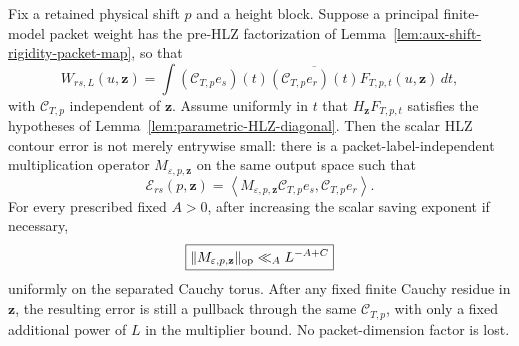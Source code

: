 \begin{lemma}
\label{lem:HLZ-error-common-output}
Fix a retained physical shift $p$ and a height block.  Suppose a principal
finite-model packet weight has the pre-HLZ factorization of
Lemma~\ref{lem:aux-shift-rigidity-packet-map}, so that
\begin{equation}
W_{rs,L}(u,\mathbf z)
=\int
 (\mathscr C_{T,p}e_s)(t)
 \overline{(\mathscr C_{T,p}e_r)(t)}
 F_{T,p,t}(u,\mathbf z)\,dt,
\label{eq:HLZ-error-slice-factorization}
\end{equation}
with $\mathscr C_{T,p}$ independent of $\mathbf z$.  Assume uniformly in $t$
that $H_{\mathbf z}F_{T,p,t}$ satisfies the hypotheses of
Lemma~\ref{lem:parametric-HLZ-diagonal}.  Then the scalar HLZ contour error is
not merely entrywise small: there is a packet-label-independent multiplication
operator $M_{\varepsilon,p,\mathbf z}$ on the same output space such that
\begin{equation}
\boxed{
\mathcal E_{rs}(p,\mathbf z)
=\left\langle
 M_{\varepsilon,p,\mathbf z}\mathscr C_{T,p}e_s,
 \mathscr C_{T,p}e_r
\right\rangle.
}
\label{eq:HLZ-error-common-output}
\end{equation}
For every prescribed fixed $A>0$, after increasing the scalar saving exponent
if necessary,
\begin{equation}
\boxed{
\|M_{\varepsilon,p,\mathbf z}\|_{\rm op}
\ll_A L^{-A+C}
}
\label{eq:HLZ-error-multiplier-bound}
\end{equation}
uniformly on the separated Cauchy torus.  After any fixed finite Cauchy residue
in $\mathbf z$, the resulting error is still a pullback through the same
$\mathscr C_{T,p}$, with only a fixed additional power of $L$ in the multiplier
bound.  No packet-dimension factor is lost.
\end{lemma}

